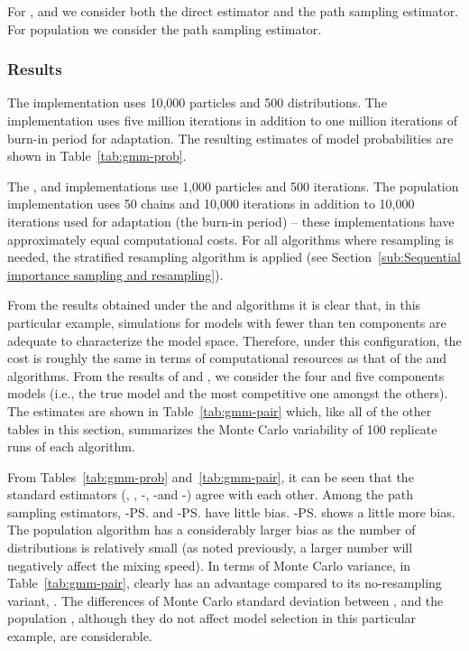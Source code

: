 For \smc[2], \smc[3] and \ais we consider both the direct estimator and the
path sampling estimator. For population \mcmc we consider the path sampling
estimator.

\subsubsection{Results}
\label{sec:gmm_res}

The \smc[1] implementation uses 10,000 particles and 500 distributions. The
\rjmcmc implementation uses five million iterations in addition to one million
iterations of burn-in period for adaptation. The resulting estimates of model
probabilities are shown in Table~\ref{tab:gmm-prob}.

The \smc[2], \smc[3] and \ais implementations use 1,000 particles and 500
iterations. The population \mcmc implementation uses 50 chains and 10,000
iterations in addition to 10,000 iterations used for adaptation (the burn-in
period) -- these implementations have approximately equal computational costs.
For all algorithms where resampling is needed, the stratified resampling
algorithm is applied (see Section~\ref{sub:Sequential importance sampling and
  resampling}).

From the results obtained under the \smc[1] and \rjmcmc algorithms it is clear
that, in this particular example, simulations for models with fewer than ten
components are adequate to characterize the model space. Therefore, under this
configuration, the cost is roughly the same in terms of computational
resources as that of the \smc[1] and \rjmcmc algorithms. From the results of
\rjmcmc and \smc[1], we consider the four and five components models (i.e.,
the true model and the most competitive one amongst the others). The estimates
are shown in Table~\ref{tab:gmm-pair} which, like all of the other tables in
this section, summarizes the Monte Carlo variability of 100 replicate runs of
each algorithm.




From Tables~\ref{tab:gmm-prob} and~\ref{tab:gmm-pair}, it can be seen that the
standard estimators (\rjmcmc, \smc[1], \smc[2]-\ds, \smc[3]-\ds and \ais-\ds)
agree with each other. Among the path sampling estimators, \smc[2]-\ps and
\ais-\ps have little bias. \smc[3]-\ps shows a little more bias. The
population \mcmc algorithm has a considerably larger bias as the number of
distributions is relatively small (as noted previously, a larger number will
negatively affect the mixing speed). In terms of Monte Carlo variance, in
Table~\ref{tab:gmm-pair}, \smc[2] clearly has an advantage compared to its
no-resampling variant, \ais. The differences of Monte Carlo standard deviation
between \smc[2], \smc[3] and the population \mcmc, although they do not affect
model selection in this particular example, are considerable.

